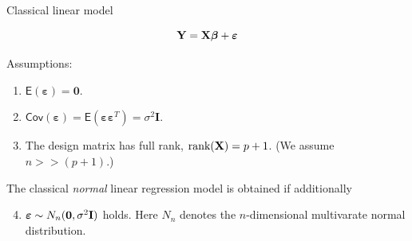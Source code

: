 \documentclass[
  10pt,
  ignorenonframetext,
]{beamer}
\providecommand{\tightlist}{%
  \setlength{\itemsep}{0pt}\setlength{\parskip}{0pt}}
\begin{document}
\begin{frame}
\begin{block}{Classical linear model}
\protect\hypertarget{classical-linear-model}{}
\(~\)

\[{\bf Y=X \boldsymbol\beta}+{\boldsymbol \varepsilon}\]

Assumptions: \vspace{2mm}

\begin{enumerate}
\tightlist
\item
  \(\mathsf{E}(\boldsymbol{\varepsilon})=\boldsymbol{0}\). \vspace{2mm}
\item
  \(\mathsf{Cov}(\boldsymbol{\varepsilon})=\mathsf{E}(\boldsymbol{\varepsilon}\boldsymbol{\varepsilon}^T)=\sigma^2\boldsymbol{I}\).
  \vspace{2mm}
\item
  The design matrix has full rank, \(\text{rank}({\bf X})=p+1\). (We
  assume \(n>>(p+1)\).)
\end{enumerate}

\vspace{2mm}

The classical \emph{normal} linear regression model is obtained if
additionally

\begin{enumerate}
\setcounter{enumi}{3}
\tightlist
\item
  \(\boldsymbol\varepsilon\sim N_n({\boldsymbol 0},\sigma^2 {\bf I})\)
  holds. Here \(N_n\) denotes the \(n\)-dimensional multivarate normal
  distribution.
\end{enumerate}
\end{block}
\end{frame}
\end{document}

